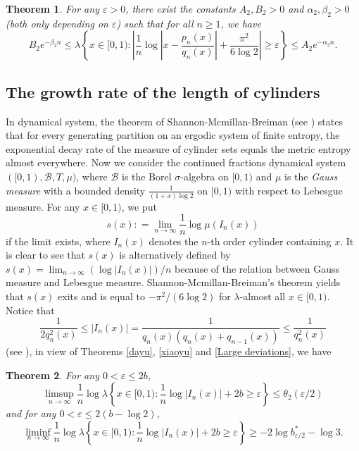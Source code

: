 \documentclass[reqno]{amsart}
\newtheorem{theorem}{Theorem}[section]
\theoremstyle{definition}
\numberwithin{equation}{section}
\begin{document}
\begin{theorem}\label{Diophantine}
For any $\varepsilon > 0$, there exist the constants $A_2, B_2> 0$ and $\alpha_2, \beta_2 > 0$ (both only depending on $\varepsilon$) such that for all $n \geq 1$, we have
\begin{equation*}
B_2e^{-\beta_2 n} \leq \lambda \left\{x \in [0,1):\left|\frac{1}{n}\log\left|x - \frac{p_n(x)}{q_n(x)}\right| + \frac{\pi^2}{6\log2}\right| \geq \varepsilon\right\} \leq A_2e^{-\alpha_2 n}.
\end{equation*}
\end{theorem}

\subsection{The growth rate of the length of cylinders}
In dynamical system, the theorem of Shannon-Mcmillan-Breiman (see \cite[Theorem 6.2.1]{lesDK02}) states that for every generating partition on an ergodic system of finite entropy, the exponential decay rate of the measure of cylinder sets equals the metric entropy almost everywhere. Now we consider the continued fractions dynamical system $([0,1), \mathcal{B}, T, \mu)$, where $\mathcal{B}$ is the Borel $\sigma$-algebra on $[0,1)$ and $\mu$ is the \emph{Gauss measure} with a bounded density $\frac{1}{(1+x) \log 2}$ on $[0,1)$ with respect to Lebesgue measure. For any $x \in [0,1)$, we put
\[
s(x): = \lim\limits_{n \to \infty}\frac{1}{n}\log \mu(I_n(x))
\]
if the limit exists, where $I_n(x)$ denotes the $n$-th order cylinder containing $x$.
It is clear to see that $s(x)$ is alternatively defined by $s(x) = \lim_{n \to \infty} (\log |I_n(x)|)/n$ because of the relation between Gauss measure and Lebesgue measure. Shannon-Mcmillan-Breiman's theorem yields that $s(x)$ exits and is equal to $-\pi^2/(6\log2)$ for $\lambda$-almost all $x \in [0,1)$.
Notice that
\[
\frac{1}{2q^2_n(x)} \leq |I_n(x)| = \frac{1}{q_n(x)(q_n(x)+q_{n-1}(x))} \leq \frac{1}{q^2_n(x)}
\]
(see \cite{lesDK02, lesIK02}), in view of Theorems \ref{dayu}, \ref{xiaoyu} and \ref{Large deviations}, we have

\begin{theorem}
For any $0<\varepsilon \leq 2b$,
\begin{equation*}
\limsup_{n \to \infty} \frac{1}{n}\log \lambda\left\{x\in [0,1):\frac{1}{n}\log |I_n(x)| + 2b \geq \varepsilon\right\} \leq \theta_2(\varepsilon/2)
\end{equation*}
 and for any $0<\varepsilon \leq 2(b -\log 2)$,
\begin{equation*}
\liminf_{n \to \infty} \frac{1}{n}\log \lambda\left\{x\in [0,1):\frac{1}{n}\log |I_n(x)| + 2b \geq \varepsilon\right\} \geq -2\log b^\ast_{\varepsilon/2}-\log 3.
\end{equation*}
\end{theorem}
\end{document}
